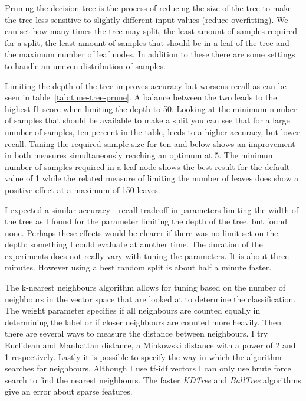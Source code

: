 \documentclass[11pt]{article}
\begin{document}
Pruning the decision tree is the process of reducing the size of the tree to make the tree less sensitive to slightly different input values (reduce overfitting). We can set how many times the tree may split, the least amount of samples required for a split, the least amount of samples that should be in a leaf of the tree and the maximum number of leaf nodes. In addition to these there are some settings to handle an uneven distribution of samples.

Limiting the depth of the tree improves accuracy but worsens recall as can be seen in table~\ref{tab:tune-tree-prune}. A balance between the two leads to the highest f1 score when limiting the depth to 50. Looking at the minimum number of samples that should be available to make a split you can see that for a large number of samples, ten percent in the table, leeds to a higher accuracy, but lower recall. Tuning the required sample size for ten and below shows an improvement in both measures simultaneously reaching an optimum at 5. The minimum number of samples required in a leaf node shows the best result for the default value of 1 while the related measure of limiting the number of leaves does show a positive effect at a maximum of 150 leaves.

I expected a similar accuracy - recall tradeoff in parameters limiting the width of the tree as I found for the parameter limiting the depth of the tree, but found none. Perhaps these effects would be clearer if there was no limit set on the depth; something I could evaluate at another time. The duration of the experiments does not really vary with tuning the parameters. It is about three minutes. However using a best random split is about half a minute faster.

The k-nearest neighbours algorithm allows for tuning based on the number of neighbours in the vector space that are looked at to determine the classification. The weight parameter specifies if all neighbours are counted equally in determining the label or if closer neighbours are counted more heavily. Then there are several ways to measure the distance between neighbours. I try Euclidean and Manhattan distance, a Minkowski distance with a power of 2 and 1 respectively. Lastly it is possible to specify the way in which the algorithm searches for neighbours. Although I use tf-idf vectors I can only use brute force search to find the nearest neighbours. The faster \emph{KDTree} and \emph{BallTree} algorithms give an error about sparse features.
\end{document}
